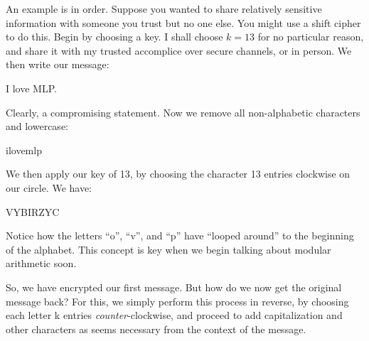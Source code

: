 \documentclass{article}
\begin{document}
        An example is in order.  Suppose you wanted to share relatively sensitive information with someone you trust but no one else.  
        You might use a shift cipher to do this.
        Begin by choosing a key.  I shall choose $k=13$ for no particular reason, and share it with my trusted accomplice over secure channels, or in person.
        We then write our message:
        \begin{center}
        	I love MLP.
        \end{center}
        
        Clearly, a compromising statement.  Now we remove all non-alphabetic characters and lowercase:
        
        \begin{center}
        	ilovemlp
        \end{center}
        
        We then apply our key of 13, by choosing the character 13 entries clockwise on our circle.  
        We have:
        
        \begin{center}
        	VYBIRZYC
        \end{center}
        
        Notice how the letters ``o'', ``v'', and ``p'' have ``looped around'' to the beginning of the alphabet.  
        This concept is key when we begin talking about modular arithmetic soon.
        
        So, we have encrypted our first message.  But how do we now get the original message back?  
        For this, we simply perform this process in reverse, by choosing each letter k entries \textit{counter}-clockwise, and proceed to add capitalization and other characters as seems necessary from the context of the message.
        
\end{document}

